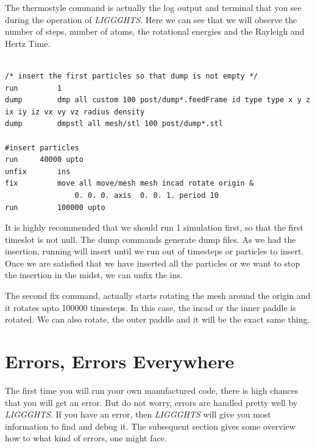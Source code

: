 \documentclass{tufte-book} %
\newcommand{\Li}{\textit{LIGGGHTS}\xspace}
\begin{document}
The thermostyle command is actually the log output and terminal that you see during the operation of \Li. Here we can see that we will observe the number of steps, number of atoms, the rotational energies and the Rayleigh and Hertz Time.
\begin{verbatim}

/* insert the first particles so that dump is not empty */
run			1
dump		dmp all custom 100 post/dump*.feedFrame id type type x y z ix iy iz vx vy vz radius density  
dump 		dmpstl all mesh/stl 100 post/dump*.stl

#insert particles
run		40000 upto
unfix		ins
fix 		move all move/mesh mesh incad rotate origin &
                0. 0. 0. axis  0. 0. 1. period 10
run 		100000 upto 

\end{verbatim}
It is highly recommended that we should run 1 simulation first, so that the first timeslot is not null.
The dump commands generate dump files.
As we had the insertion, running will insert until we run out of timesteps or particles to insert. Once we are satisfied  that we have inserted all the particles or we want to stop the insertion in the midst, we can unfix the ins.

The second fix command, actually starts rotating the mesh around the origin and it rotates upto 100000 timesteps. In this case, the incad or the inner paddle is rotated. We can also rotate, the outer paddle and it will be the exact same thing. 

\section{Errors, Errors Everywhere}
The first time you will run your own manufactured code, there is high chances that you will get an error. But do not worry, errors are handled pretty well by \Li. If you have an error, then \Li will give you most information to find and debug it. The subsequent section gives some overview how to what kind of errors, one might face.
\end{document}
